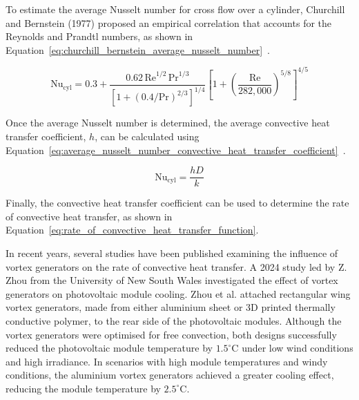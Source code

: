 To estimate the average Nusselt number for cross flow over a cylinder, Churchill and Bernstein (1977) proposed an empirical correlation that accounts for the Reynolds and Prandtl numbers, as shown in Equation~\ref{eq:churchill_bernstein_average_nusselt_number}~\cite{Cengel2014ExternalConvection}.

\begin{equation}
    \text{Nu}_{\text{cyl}} = 0.3 + \frac{0.62\,\text{Re}^{1/2}\,\text{Pr}^{1/3}}{\left[1 + (0.4/\text{Pr})^{2/3}\right]^{1/4}} \left[1 + \left(\frac{\text{Re}}{282,000}\right)^{5/8}\right]^{4/5}
    \label{eq:churchill_bernstein_average_nusselt_number}
\end{equation}

Once the average Nusselt number is determined, the average convective heat transfer coefficient, \(h\), can be calculated using Equation~\ref{eq:average_nusselt_number_convective_heat_transfer_coefficient}~\cite{Cengel2014ExternalConvection}.

\begin{equation}
    \text{Nu}_{\text{cyl}} = \frac{h D}{k}
    \label{eq:average_nusselt_number_convective_heat_transfer_coefficient}
\end{equation}

Finally, the convective heat transfer coefficient can be used to determine the rate of convective heat transfer, as shown in Equation~\ref{eq:rate_of_convective_heat_transfer_function}. \cite{Cengel2014IntroductionConcepts} \vspace{0.5em}

In recent years, several studies have been published examining the influence of vortex generators on the rate of convective heat transfer. A 2024 study led by Z. Zhou from the University of New South Wales investigated the effect of vortex generators on photovoltaic module cooling. Zhou et al. attached rectangular wing vortex generators, made from either aluminium sheet or 3D printed thermally conductive polymer, to the rear side of the photovoltaic modules. Although the vortex generators were optimised for free convection, both designs successfully reduced the photovoltaic module temperature by $1.5^{\circ} \text{C}$ under low wind conditions and high irradiance. In scenarios with high module temperatures and windy conditions, the aluminium vortex generators achieved a greater cooling effect, reducing the module temperature by $2.5^{\circ} \text{C}$. \cite{Zhou2024Long-termCooling} \vspace{0.5em}

